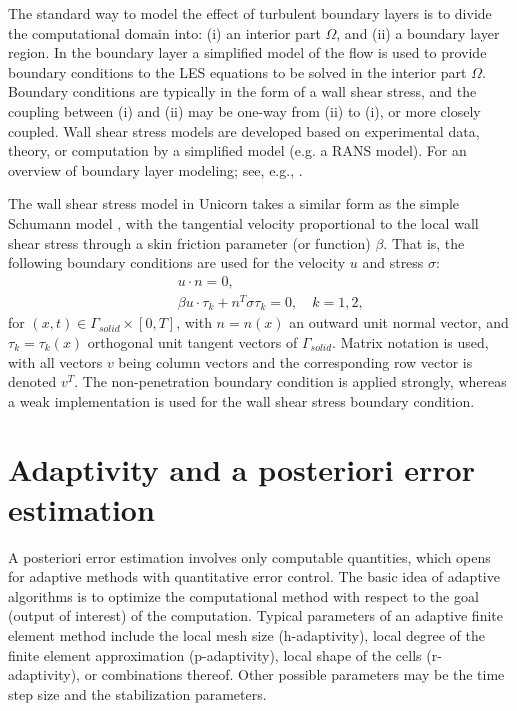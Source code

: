 The standard way to model the effect of turbulent boundary layers is to
divide the computational domain into: (i) an interior part $\Omega$, and
(ii) a boundary layer region. In the boundary layer a simplified model of
the flow is used to provide boundary conditions to the LES equations to be
solved in the interior part $\Omega$. Boundary conditions are typically in
the form of a wall shear stress, and the coupling between (i) and (ii) may
be one-way from (ii) to (i), or more closely coupled. Wall shear stress
models are developed based on experimental data, theory, or computation by
a simplified model (e.g. a RANS model). For an overview of boundary layer
modeling; see, e.g., \citet{SagautDeckTerracol2006,PiomelliBalaras2002}.

The wall shear stress model in Unicorn takes a similar form as the
simple Schumann model \citep{Schumann1975}, with the tangential velocity
proportional to the local wall shear stress through a skin friction
parameter (or function) $\beta$. That is, the following boundary
conditions are used for the velocity $u$ and stress $\sigma$:
\begin{eqnarray}
&&u\cdot n=0, \label{slfra} \\
&&\beta u\cdot \tau _k + n^T\sigma \tau _k=0,\quad k=1,2, \label{slfrb}
\end{eqnarray}
for  $(x,t)\in \Gamma_{solid}\times [0,T]$, with $n=n(x)$ an outward unit normal vector, and $\tau_k=\tau_k(x)$ orthogonal unit tangent vectors of $\Gamma_{solid}$. Matrix notation is used, with all vectors $v$ being column vectors and the corresponding row vector is denoted $v^T$. The non-penetration boundary condition is applied strongly, whereas a weak implementation is used for the wall shear stress boundary condition.

\section{Adaptivity and a posteriori error estimation}

A posteriori error estimation involves only computable quantities, which
opens for adaptive methods with quantitative error control. The basic
idea of adaptive algorithms is to optimize the computational method with
respect to the goal (output of interest) of the computation. Typical
parameters of an adaptive finite element method include the local mesh
size (h-adaptivity), local degree of the finite element approximation
(p-adaptivity), local shape of the cells (r-adaptivity), or combinations
thereof. Other possible parameters may be the time step size and the
stabilization parameters.

